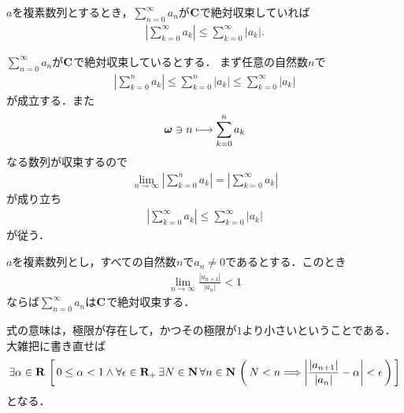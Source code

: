 	\begin{screen}
		\begin{thm}[級数の絶対値と絶対値の級数]
			$a$を複素数列とするとき，$\sum_{n=0}^\infty a_n$が$\mathbf{C}$で絶対収束していれば
			\begin{align}
				\left|\sum_{k=0}^{\infty} a_{k}\right| \leq \sum_{k=0}^{\infty} |a_{k}|.
			\end{align}
		\end{thm}
	\end{screen}
	
	\begin{sketch}
		$\sum_{n=0}^\infty a_n$が$\mathbf{C}$で絶対収束しているとする．
		まず任意の自然数$n$で
		\begin{align}
			\left|\sum_{k=0}^{n} a_{k}\right| \leq \sum_{k=0}^{n} |a_{k}| \leq \sum_{k=0}^{\infty} |a_{k}|
		\end{align}
		が成立する．また
		\begin{align}
			{\boldsymbol \omega} \ni n \longmapsto \sum_{k=0}^{n} a_{k}
		\end{align}
		なる数列が収束するので
		\begin{align}
			\lim_{n \to \infty} \left|\sum_{k=0}^{n} a_{k}\right| = \left|\sum_{k=0}^{\infty} a_{k}\right|
		\end{align}
		が成り立ち
		\begin{align}
			\left|\sum_{k=0}^{\infty} a_{k}\right| \leq \sum_{k=0}^{\infty} |a_{k}|
		\end{align}
		が従う．
		\QED
	\end{sketch}
	
	\begin{screen}
		\begin{thm}[d'Alembertの収束判定法]
			$a$を複素数列とし，すべての自然数$n$で$a_n \neq 0$であるとする．このとき
			\begin{align}
				\lim_{n \to \infty} \frac{|a_{n+1}|}{|a_n|} < 1
			\end{align}
			ならば$\sum_{n=0}^\infty a_n$は$\mathbf{C}$で絶対収束する．
		\end{thm}
	\end{screen}
	
	式の意味は，極限が存在して，かつその極限が$1$より小さいということである．大雑把に書き直せば
	\begin{align}
		\exists \alpha \in \mathbf{R}\, \left[\, 
		0 \leq \alpha < 1 \wedge \forall \epsilon \in \mathbf{R}_+\, \exists N \in \mathbf{N}\, \forall n \in \mathbf{N}\,
		\left(\, N < n \Longrightarrow \left|\frac{|a_{n+1}|}{|a_n|} - \alpha\right| < \epsilon\, \right)\, \right]
	\end{align}
	となる．
	
